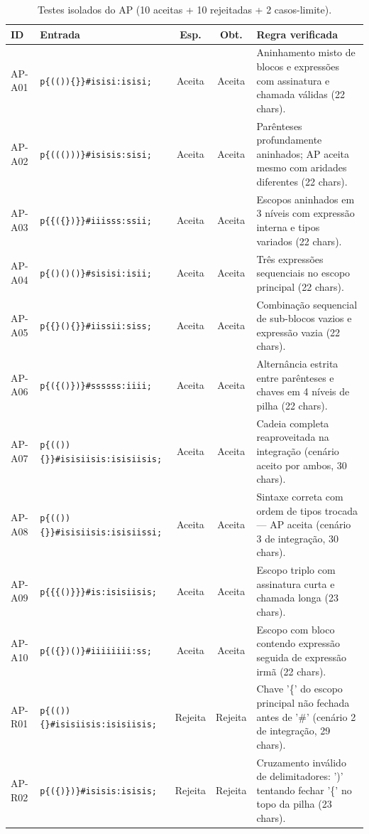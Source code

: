 \begin{table}[t]
\centering
\caption{Testes isolados do AP (10 aceitas + 10 rejeitadas + 2 casos-limite).}
\label{tab:casos_ap}
\scriptsize\setlength{\tabcolsep}{4pt}
\begin{tabularx}{\textwidth}{@{}llccX@{}}
\toprule
ID & Entrada & Esp. & Obt. & Regra verificada \\
\midrule
AP-A01 & \texttt{p\{(())\{\}\}\#isisi:isisi;} & Aceita & Aceita & Aninhamento misto de blocos e expressões com assinatura e chamada válidas (22 chars). \\
AP-A02 & \texttt{p\{((()))\}\#isisis:sisi;} & Aceita & Aceita & Parênteses profundamente aninhados; AP aceita mesmo com aridades diferentes (22 chars). \\
AP-A03 & \texttt{p\{\{(\{\})\}\}\#iiisss:ssii;} & Aceita & Aceita & Escopos aninhados em 3 níveis com expressão interna e tipos variados (22 chars). \\
AP-A04 & \texttt{p\{()()()\}\#sisisi:isii;} & Aceita & Aceita & Três expressões sequenciais no escopo principal (22 chars). \\
AP-A05 & \texttt{p\{\{\}()\{\}\}\#iissii:siss;} & Aceita & Aceita & Combinação sequencial de sub-blocos vazios e expressão vazia (22 chars). \\
AP-A06 & \texttt{p\{(\{()\})\}\#ssssss:iiii;} & Aceita & Aceita & Alternância estrita entre parênteses e chaves em 4 níveis de pilha (22 chars). \\
AP-A07 & \texttt{p\{(())\{\}\}\#isisiisis:isisiisis;} & Aceita & Aceita & Cadeia completa reaproveitada na integração (cenário aceito por ambos, 30 chars). \\
AP-A08 & \texttt{p\{(())\{\}\}\#isisiisis:isisiissi;} & Aceita & Aceita & Sintaxe correta com ordem de tipos trocada --- AP aceita (cenário 3 de integração, 30 chars). \\
AP-A09 & \texttt{p\{\{\{()\}\}\}\#is:isisiisis;} & Aceita & Aceita & Escopo triplo com assinatura curta e chamada longa (23 chars). \\
AP-A10 & \texttt{p\{(\{\})()\}\#iiiiiiii:ss;} & Aceita & Aceita & Escopo com bloco contendo expressão seguida de expressão irmã (22 chars). \\
AP-R01 & \texttt{p\{(())\{\}\#isisiisis:isisiisis;} & Rejeita & Rejeita & Chave '\{' do escopo principal não fechada antes de '\#' (cenário 2 de integração, 29 chars). \\
AP-R02 & \texttt{p\{(\{)\})\}\#isisis:isisis;} & Rejeita & Rejeita & Cruzamento inválido de delimitadores: ')' tentando fechar '\{' no topo da pilha (23 chars). \\

\end{tabularx}
\end{table}
